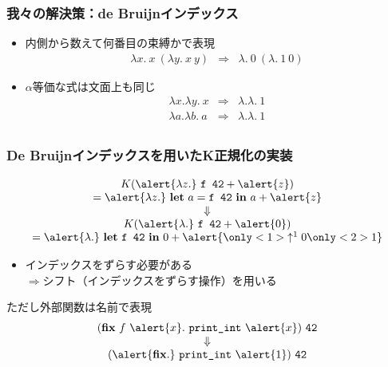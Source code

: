 \documentclass[t,dvipdfmx,cjk,xcolor=dvipsnames,envcountsect,notheorems,12pt]{beamer}
\theoremstyle{definition}
\newcommand{\keyword}[1]{\mathbf{#1}}
\newcommand{\LET}{\keyword{let}}
\newcommand{\FIX}{\keyword{fix}}
\newcommand{\IN}{\keyword{in}}
\begin{document}
\begin{frame}
	\frametitle{我々の解決策：de Bruijnインデックス}
	\begin{itemize}
		\item 内側から数えて何番目の束縛かで表現
			{\LARGE \[\begin{array}{lcl}
				\lambda x.~x~(\lambda y.~x~y) & \Rightarrow & \lambda.~0~(\lambda.~1~0)
			\end{array}\]}
		\item $\alpha$等価な式は文面上も同じ
			{\LARGE \[\begin{array}{lcl}
				\lambda x.\lambda y.~x & \Rightarrow & \lambda.\lambda.~1 \\
				\lambda a.\lambda b.~a & \Rightarrow & \lambda.\lambda.~1 \\
			\end{array}\]}
	\end{itemize}
\end{frame}

\begin{frame}[fragile]
	\frametitle{De Bruijnインデックスを用いたK正規化の実装}
	{\LARGE \[ \begin{array}{c}
		K(\alert{\lambda z.}~\texttt{f 42}+\alert{z})\\
		= \alert{\lambda z.}~\LET~a=\texttt{f 42}~\IN~a+\alert{z}\\
		\Downarrow\\
		K(\alert{\lambda.}~\texttt{f 42}+\alert{0})\\
		= \alert{\lambda.}~\LET~\texttt{f~42}~\IN~0+\alert{\only<1>{\uparrow^1 0}\only<2>{1}}
	\end{array}\]}
	\vfill
	\begin{itemize}
		\item \alert{インデックスをずらす必要がある}\\
		{\large $\Rightarrow$シフト（インデックスをずらす操作）を用いる}
	\end{itemize}
\end{frame}

\begin{frame}
	\Large
	ただし外部関数は名前で表現
	\vfill
	{\LARGE \[\begin{array}{c}
		(\FIX~f~\alert{x}.~\texttt{print\_int}~\alert{x})~\texttt{42}\\
		\Downarrow\\
		(\alert{\FIX.}~\texttt{print\_int}~\alert{1})~\texttt{42}
	\end{array}\]}
\end{frame}
\end{document}
